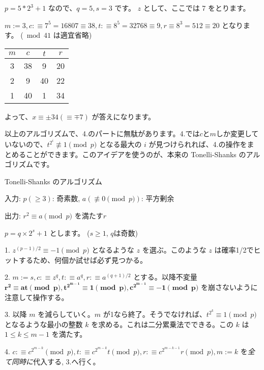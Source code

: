 \documentclass{jsarticle}
\begin{document}
$p = 5 * 2^3 + 1$ なので、$q = 5, s = 3$ です。
$z$ として、ここでは 7 をとります。

$m := 3, c :\equiv 7^5 = 16807 \equiv 38, t :\equiv 8^5 = 32768 \equiv 9, r \equiv 8^3 = 512 \equiv 20$ となります。 (${} \bmod 41$ は適宜省略)

 \begin{table}[htb]
  \begin{center}
  \begin{tabular}[t]{|c|c|c|c|}
   \hline
   $m$ & $c$ & $t$ & $r$ \\ \hline
   3 & 38 & 9 & 20 \\
   2 & 9 & 40 & 22 \\
   1 & 40 & 1 & 34 \\ \hline
  \end{tabular}
  \end{center}
 \end{table}


よって、$x \equiv \pm 34 (\equiv \mp 7)$ が答えになります。


以上のアルゴリズムで、4.のパートに無駄があります。4.では$c$と$m$しか変更していないので、$t^{2^i}\not \equiv 1 \pmod p$ となる最大の $i$ が見つけられれば、4.の操作をまとめることができます。このアイデアを使うのが、本来の Tonelli-Shanks のアルゴリズムです。

  \begin{algorithm}                      
   \caption{Tonelli-Shanks のアルゴリズム}
   \label{alg:tonelli-shanks}
   入力: $p (\ge 3)$: 奇素数, $a (\not \equiv 0 \pmod p)$: 平方剰余

   出力: $r^2 \equiv a \pmod p$ を満たす$r$

   $p = q \times 2^s + 1$ とします。 ($s \ge 1$, $q$は奇数)

   1. $z^{(p-1)/2} \equiv -1 \pmod p$ となるような $z$ を選ぶ。このような $z$ は確率1/2でヒットするため、何個か試せば必ず見つかる。

   2. $m := s, c:\equiv z^q, t :\equiv a^q, r :\equiv a^{(q + 1)/2}$ とする。以降不変量 $\bm{r^2\equiv at \pmod p, t^{2^{m - 1}} \equiv 1 \pmod p, c^{2^{m-1}} \equiv -1 \pmod p}$ を崩さないように注意して操作する。

   3. 以降 $m$ を減らしていく。$m$ が1なら終了。そうでなければ、$t^{2^k} \equiv 1 \pmod p$ となるような最小の整数 $k$ を求める。これは二分累乗法でできる。この $k$ は $1 \le k \le m - 1$ を満たす。

   4. $c :\equiv c^{2^{m - k}} \pmod p, t :\equiv c^{2^{m - k}} t \pmod p, r :\equiv c^{2^{m - k - 1}}r \pmod p, m := k$ を\emph{全て同時に}代入する, 3.へ行く。
  \end{algorithm}
\end{document}
